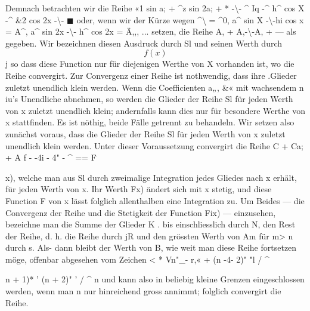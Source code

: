 \documentclass[11pt,a4paper]{article}
\begin{document}
{{{{%
Demnach  betrachten  wir  die  Reihe
«1  sin  a;  +  ^z  sin  2a;  +  *  \textbullet{}  \textbullet{}
-\textbackslash{}-  ^  Iq -^  h^  cos  X  -^  \&2  cos  2x  -\textbackslash{}-  $\blacksquare$  \textbullet{}  \textbullet{}
oder,  wenn  wir  der  Kürze  wegen
^\textbackslash{}  =  ^0,  a^  sin X  -\textbackslash{}-hi  cos x  =  A^,  a^  sin 2x  -\textbackslash{}-  h^  cos 2x  =  Ä,,,  ...
setzen,  die  Reihe
A,  +  A,-\textbackslash{}-A,  +  ---
als  gegeben.  Wir  bezeichnen  diesen  Ausdruck  durch  Sl  und  seinen
Werth  durch  $$f(x)$$j  so  dass  diese  Function  nur  für  diejenigen  Werthe
von  X  vorhanden  ist,  wo  die  Reihe  convergirt.
Zur  Convergenz  einer  Reihe  ist  nothwendig,  dass  ihre  .Glieder
zuletzt  unendlich  klein  werden.  Wenn  die  Coefficienten  a„,  \&«  mit
wachsendem  n  iu's  Unendliche  abnehmen,  so  werden  die  Glieder  der
Reihe  Sl  für  jeden  Werth  von  x  zuletzt  unendlich  klein;  andernfalls
kann  dies  nur  für  besondere  Werthe  von  x  stattfinden.  Es  ist  nöthig,
beide  Fälle  getrennt  zu  behandeln.
Wir  setzen  also  zunächst  voraus,  dass  die  Glieder  der  Reihe  Sl
für  jeden  Werth  von  x  zuletzt  unendlich  klein  werden.
Unter  dieser  Voraussetzung  convergirt  die  Reihe
C  +  Ca;  +  A  f  -  -4i  -  4"  -  ^
\textbullet{}  \textbullet{}  \textbullet{}  ==  F{x),
welche  man  aus  Sl  durch  zweimalige  Integration  jedes  Gliedes  nach  x
erhält,  für  jeden  Werth  von  x.     Ihr  Werth  F{x)  ändert   sich  mit  x
stetig,  und  diese  Function  F  von  x  lässt  folglich  allenthalben  eine
Integration  zu.
Um   Beides  ---  die  Convergenz  der  Reihe  und  die  Stetigkeit  der
Function  Fix)  ---  einzusehen,  bezeichne  man  die  Summe  der  Glieder
K    \textbullet{}         \textbullet{}       .
bis   einschliesslich  durch  N,  den  Rest  der  Reihe,  d.  h.  die  Reihe
durch  jR  und  den  grössten  Werth  von  Am  für  m>  n  durch  s.  Als-
dann bleibt  der  Werth  von  B,  wie  weit  man  diese  Reihe  fortsetzen
möge,  offenbar  abgesehen  vom  Zeichen
<  *  Vn"\_}-  r,«  +  (n  -4-  2)"  "l  /  ^
{{n  +  1)*    '    (n  +  2)"    '  /  ^  n
und  kann  also  in  beliebig  kleine  Grenzen  eingeschlossen  werden,  wenn
man  n  nur  hinreichend  gross  annimmt;  folglich  convergirt  die  Reihe.
\newpage

}}}}}}}
\end{document}
